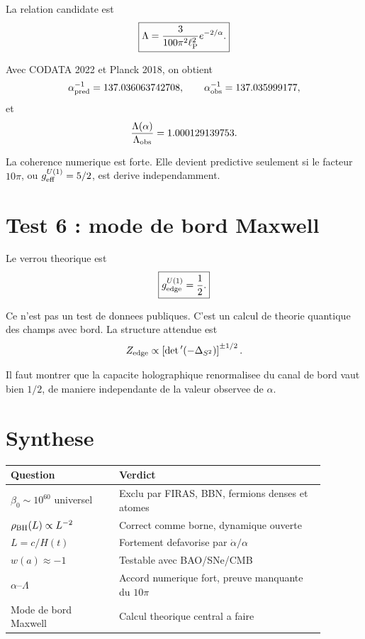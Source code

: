 \documentclass[11pt,a4paper]{article}
\newcommand{\lp}{\ell_{\rm P}}
\newcommand{\rhoBH}{\rho_{\rm BH}}
\begin{document}
La relation candidate est
\begin{equation}
\boxed{
\Lambda=
\frac{3}{100\pi^2\lp^2}e^{-2/\alpha}.
}
\end{equation}

Avec CODATA 2022 et Planck 2018, on obtient
\begin{equation}
\alpha^{-1}_{\rm pred}=137.036063742708,
\qquad
\alpha^{-1}_{\rm obs}=137.035999177,
\end{equation}
et
\begin{equation}
\frac{\Lambda(\alpha)}{\Lambda_{\rm obs}}=1.000129139753.
\end{equation}

La coherence numerique est forte. Elle devient predictive seulement si le
facteur \(10\pi\), ou \(g_{\rm eff}^{U(1)}=5/2\), est derive
independamment.

\section{Test 6 : mode de bord Maxwell}

Le verrou theorique est
\begin{equation}
\boxed{
g_{\rm edge}^{U(1)}=\frac12.
}
\end{equation}

Ce n'est pas un test de donnees publiques. C'est un calcul de theorie quantique
des champs avec bord. La structure attendue est
\begin{equation}
Z_{\rm edge}\propto
\left[\det{}'(-\Delta_{S^2})\right]^{\pm1/2}.
\end{equation}

Il faut montrer que la capacite holographique renormalisee du canal de bord
vaut bien \(1/2\), de maniere independante de la valeur observee de
\(\alpha\).

\section{Synthese}

\begin{center}
\begin{tabular}{p{0.3\linewidth} p{0.58\linewidth}}
\toprule
Question & Verdict \\
\midrule
\(\beta_0\sim10^{60}\) universel & Exclu par FIRAS, BBN, fermions denses et atomes \\
\(\rhoBH(L)\propto L^{-2}\) & Correct comme borne, dynamique ouverte \\
\(L=c/H(t)\) & Fortement defavorise par \(\dot\alpha/\alpha\) \\
\(w(a)\approx -1\) & Testable avec BAO/SNe/CMB \\
\(\alpha\)--\(\Lambda\) & Accord numerique fort, preuve manquante du \(10\pi\) \\
Mode de bord Maxwell & Calcul theorique central a faire \\
\bottomrule
\end{tabular}
\end{center}
\end{document}
